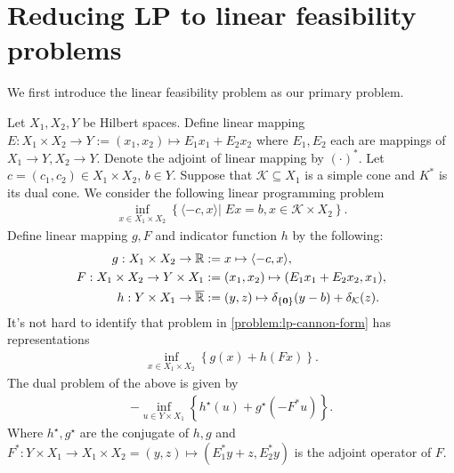 \documentclass[12pt]{report}
\begin{document}
    \section{Reducing LP to linear feasibility problems}
        We first introduce the linear feasibility problem as our primary problem. 
        \par
        Let $X_1, X_2, Y$ be Hilbert spaces. 
        Define linear mapping $E:X_1 \times X_2 \rightarrow Y := (x_1, x_2)\mapsto E_1 x_1 + E_2 x_2$ where $E_1, E_2$ each are mappings of $X_1 \rightarrow Y, X_2 \rightarrow Y$. 
        Denote the adjoint of linear mapping by $(\cdot)^*$. 
        Let $c = (c_1, c_2) \in X_1 \times X_2$, $b \in Y$. 
        Suppose that $\mathcal K \subseteq X_1$ is a simple cone and $K^*$ is its dual cone. 
        We consider the following linear programming problem 
        \begin{align}\label{problem:lp-cannon-form}
            \inf_{x \in X_1\times X_2}\left\lbrace
                \langle - c, x\rangle
                \left| \;
                    Ex = b, x \in \mathcal K \times X_2
                \right.
            \right\rbrace. 
        \end{align}
        Define linear mapping $g, F$ and indicator function $h$ by the following: 
        \begin{align*}
            g:X_1\times X_2 \rightarrow \mathbb R 
                &:= x \mapsto \langle - c, x\rangle, 
            \\
            F: X_1\times X_2 \rightarrow Y \times X_1 
                &:= (x_1, x_2) \mapsto (E_1x_1 + E_2 x_2, x_1),
            \\
            h: Y \times X_1 \rightarrow \overline {\mathbb R} &:= 
                (y, z) \mapsto \delta_{\{\mathbf 0\}}(y - b) + \delta_{\mathcal K}(z). 
        \end{align*}
        It's not hard to identify that problem in \eqref{problem:lp-cannon-form} has representations 
        \begin{align*}
            \inf_{x \in X_1\times X_2}
            \left\lbrace
                g(x) + h(Fx)
            \right\rbrace. 
        \end{align*}
        The dual problem of the above is given by
        \begin{align*}
            -\inf_{u \in Y\times X_1}
            \left\lbrace
                h^\star(u) + g^\star(-F^* u)
            \right\rbrace. 
        \end{align*}
        Where $h^\star, g^\star$ are the conjugate of $h, g$ and $F^*: Y\times X_1 \rightarrow X_1 \times X_2 = (y, z)\mapsto (E_1^*y + z, E_2^*y)$ is the adjoint operator of $F$. 
\end{document}
